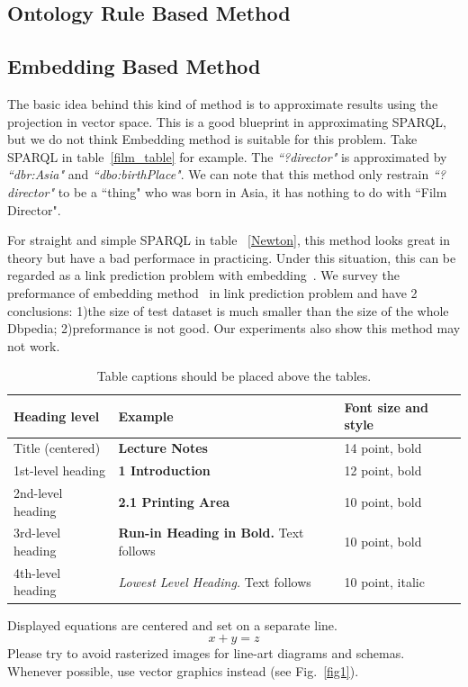 \documentclass[runningheads]{llncs}
\begin{document}
\subsection{Ontology Rule Based Method}
\subsection{Embedding Based Method}
The basic idea behind this kind of method is to approximate results using the projection in vector space.
This is a good  blueprint in approximating SPARQL, but we do not think Embedding method is suitable for this problem. Take SPARQL in table~\ref{film_table} for example. The \textit{``?director"} is approximated by \textit{``dbr:Asia"} and \textit{``dbo:birthPlace"}. We can note that this method only restrain \textit{``?director"} to be a ``thing" who was born in Asia, it has nothing to do with ``Film Director".

For straight and simple SPARQL in table ~\ref{Newton}, this method looks great in theory but have a bad performace in practicing. Under this situation, this can be regarded as a link prediction problem with embedding~\cite{kazemi2018simple}. We survey the preformance of embedding method~\cite{bordes2013translating,ji2015knowledge,qian2018translating} in link prediction problem and have 2 conclusions: 1)the size of test dataset is much smaller than the size of the whole Dbpedia; 2)preformance is not good. Our experiments also show this method may not work.


\begin{table}
\caption{Table captions should be placed above the
tables.}\label{tab1}
\begin{tabular}{|l|l|l|}
\hline
Heading level &  Example & Font size and style\\
\hline
Title (centered) &  {\Large\bfseries Lecture Notes} & 14 point, bold\\
1st-level heading &  {\large\bfseries 1 Introduction} & 12 point, bold\\
2nd-level heading & {\bfseries 2.1 Printing Area} & 10 point, bold\\
3rd-level heading & {\bfseries Run-in Heading in Bold.} Text follows & 10 point, bold\\
4th-level heading & {\itshape Lowest Level Heading.} Text follows & 10 point, italic\\
\hline
\end{tabular}
\end{table}


\noindent Displayed equations are centered and set on a separate
line.
\begin{equation}
x + y = z
\end{equation}
Please try to avoid rasterized images for line-art diagrams and
schemas. Whenever possible, use vector graphics instead (see
Fig.~\ref{fig1}).
\end{document}
